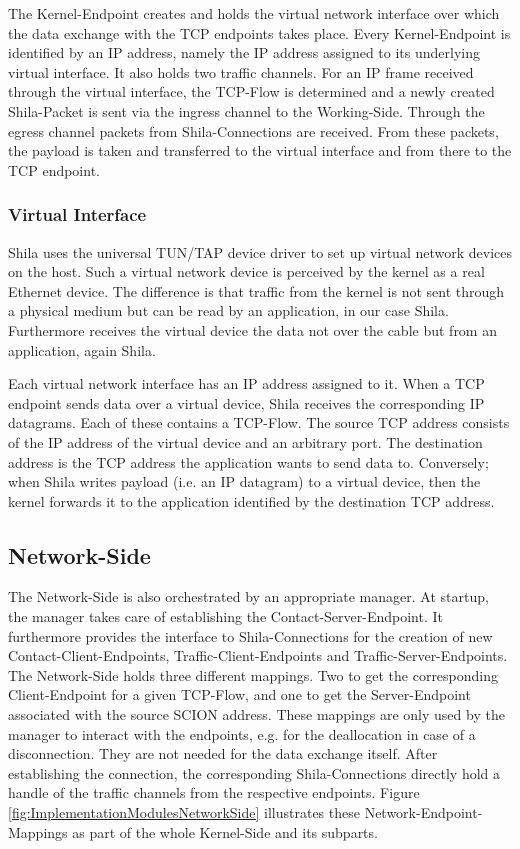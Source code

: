 The Kernel-Endpoint creates and holds the virtual network interface over which the data exchange with the TCP endpoints takes place. Every Kernel-Endpoint is identified by an IP address, namely the IP address assigned to its underlying virtual interface. It also holds two traffic channels. For an IP frame received through the virtual interface, the TCP-Flow is determined and a newly created Shila-Packet is sent via the ingress channel to the Working-Side. Through the egress channel packets from Shila-Connections are received. From these packets, the payload is taken and transferred to the virtual interface and from there to the TCP endpoint.

\subsubsection{Virtual Interface}

Shila uses the universal TUN/TAP device driver \cite{TUNTAPDriver} to set up virtual network devices on the host. Such a virtual network device is perceived by the kernel as a real Ethernet device. The difference is that traffic from the kernel is not sent through a physical medium but can be read by an application, in our case Shila. Furthermore receives the virtual device the data not over the cable but from an application, again Shila.

Each virtual network interface has an IP address assigned to it. When a TCP endpoint sends data over a virtual device, Shila receives the corresponding IP datagrams. Each of these contains a TCP-Flow. The source TCP address consists of the IP address of the virtual device and an arbitrary port. The destination address is the TCP address the application wants to send data to. Conversely; when Shila writes payload (i.e. an IP datagram) to a virtual device, then the kernel forwards it to the application identified by the destination TCP address.  

\subsection*{Network-Side}

The Network-Side is also orchestrated by an appropriate manager. At startup, the manager takes care of establishing the Contact-Server-Endpoint. It furthermore provides the interface to Shila-Connections for the creation of new Contact-Client-Endpoints, Traffic-Client-Endpoints and Traffic-Server-Endpoints. The Network-Side holds three different mappings. Two to get the corresponding Client-Endpoint for a given TCP-Flow, and one to get the Server-Endpoint associated with the source SCION address. These mappings are only used by the manager to interact with the endpoints, e.g. for the deallocation in case of a disconnection. They are not needed for the data exchange itself. After establishing the connection, the corresponding Shila-Connections directly hold a handle of the traffic channels from the respective endpoints. Figure \ref{fig:ImplementationModulesNetworkSide} illustrates these Network-Endpoint-Mappings as part of the whole Kernel-Side and its subparts.  

